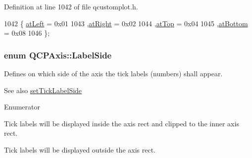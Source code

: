 Definition at line 1042 of file qcustomplot.\+h.


\begin{DoxyCode}
1042                 \{ \hyperlink{class_q_c_p_axis_ae2bcc1728b382f10f064612b368bc18aaf84aa6cac6fb6099f54a2cbf7546b730}{atLeft}    = 0x01  
1043                   ,\hyperlink{class_q_c_p_axis_ae2bcc1728b382f10f064612b368bc18aadf5509f7d29199ef2f263b1dd224b345}{atRight}  = 0x02  
1044                   ,\hyperlink{class_q_c_p_axis_ae2bcc1728b382f10f064612b368bc18aac0ece2b680d3f545e701f75af1655977}{atTop}    = 0x04  
1045                   ,\hyperlink{class_q_c_p_axis_ae2bcc1728b382f10f064612b368bc18aa220d68888516b6c3b493d144f1ba438f}{atBottom} = 0x08  
1046                 \};
\end{DoxyCode}
\hypertarget{class_q_c_p_axis_a24b13374b9b8f75f47eed2ea78c37db9}{}
\subsubsection[{Label\+Side}]{\setlength{\rightskip}{0pt plus 5cm}enum {\bf Q\+C\+P\+Axis\+::\+Label\+Side}}\label{class_q_c_p_axis_a24b13374b9b8f75f47eed2ea78c37db9}
Defines on which side of the axis the tick labels (numbers) shall appear.

\begin{DoxySeeAlso}{See also}
\hyperlink{class_q_c_p_axis_a13ec644fc6e22715744c92c6dfa4f0fa}{set\+Tick\+Label\+Side} 
\end{DoxySeeAlso}
\begin{Desc}
\item[Enumerator]\par
\begin{description}
\item[{\em 
\hypertarget{class_q_c_p_axis_a24b13374b9b8f75f47eed2ea78c37db9aae7b027ac2839cf4ad611df30236fc3f}{}ls\+Inside\label{class_q_c_p_axis_a24b13374b9b8f75f47eed2ea78c37db9aae7b027ac2839cf4ad611df30236fc3f}
}]Tick labels will be displayed inside the axis rect and clipped to the inner axis rect. \item[{\em 
\hypertarget{class_q_c_p_axis_a24b13374b9b8f75f47eed2ea78c37db9a2eadb509fc0c9a8b35b85c86ec9f3c7a}{}ls\+Outside\label{class_q_c_p_axis_a24b13374b9b8f75f47eed2ea78c37db9a2eadb509fc0c9a8b35b85c86ec9f3c7a}
}]Tick labels will be displayed outside the axis rect. \end{description}
\end{Desc}


